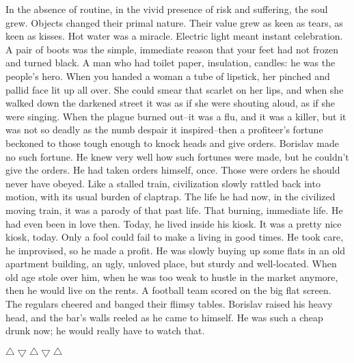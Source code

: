 \documentclass[20 pt,twoside,extrafontsizes,final]{memoir}
\begin{document}
In the absence of routine, in the vivid presence of risk and suffering, the soul grew. Objects changed their primal nature. Their value grew as keen as tears, as keen as kisses. Hot water was a miracle. Electric light meant instant celebration. A pair of boots was the simple, immediate reason that your feet had not frozen and turned black. A man who had toilet paper, insulation, candles: he was the people's hero. When you handed a woman a tube of lipstick, her pinched and pallid face lit up all over. She could smear that scarlet on her lips, and when she walked down the darkened street it was as if she were shouting aloud, as if she were singing. When the plague burned out--it was a flu, and it was a killer, but it was not so deadly as the numb despair it inspired--then a profiteer's fortune beckoned to those tough enough to knock heads and give orders. Borislav made no such fortune. He knew very well how such fortunes were made, but he couldn't give the orders. He had taken orders himself, once. Those were orders he should never have obeyed. Like a stalled train, civilization slowly rattled back into motion, with its usual burden of claptrap. The life he had now, in the civilized moving train, it was a parody of that past life. That burning, immediate life. He had even been in love then. Today, he lived inside his kiosk. It was a pretty nice kiosk, today. Only a fool could fail to make a living in good times. He took care, he improvised, so he made a profit. He was slowly buying up some flats in an old apartment building, an ugly, unloved place, but sturdy and well-located. When old age stole over him, when he was too weak to hustle in the market anymore, then he would live on the rents. A football team scored on the big flat screen. The regulars cheered and banged their flimsy tables. Borislav raised his heavy head, and the bar's walls reeled as he came to himself. He was such a cheap drunk now; he would really have to watch that.

\bigskip\centerline{{$\bigtriangleup\bigtriangledown\bigtriangleup\bigtriangledown\bigtriangleup$}}\bigskip
\end{document}
